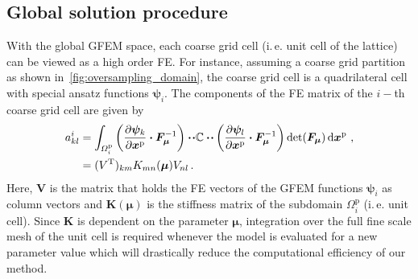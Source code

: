 \documentclass[a4paper]{eccomas_paper-2024}
\makeatletter
\newcommand{\ie}{i.\,e.\@\xspace}
\newcommand{\m}{\bm\mu}
\newcommand{\p}{\mathrm{p}}
\renewcommand{\top}{\mathrm{T}}
\makeatother
\begin{document}
\subsection{Global solution procedure} %
\label{sub:Online efficiency}
With the global GFEM space, each coarse grid cell (\ie{} unit cell of the lattice) can be viewed as a high order FE.
For instance, assuming a coarse grid partition as shown in~\cref{fig:oversampling_domain}, the coarse grid cell is a quadrilateral cell with special ansatz functions $\bm{\psi}_i$.
The components of the FE matrix of the $i-$th coarse grid cell are given by
\begin{align}
    \begin{split}
        a^i_{kl} &= \int_{\varOmega^{\p}_i} \left(\pdv{\bm{\psi}_k}{\bm{x}^{\p}}\vdot\bm{F}^{-1}_{\m}\right)\vdot\!\vdot \mathbb{C} \vdot\!\vdot
    \left(\pdv{\bm{\psi}_l}{\bm{x}^{\p}}\vdot\bm{F}^{-1}_{\m}\right)\det(\bm{F}_{\m})\dd{\bm{x}^{\p}}\,,\\
                 &= ({V}^\top)_{km} {K}_{mn}(\m){V}_{nl}\,.
    \end{split}
    \label{eq:element_matrix}
\end{align}
Here, $\bm{V}$ is the matrix that holds the FE vectors of the GFEM functions $\bm\psi_i$ as column vectors and $\bm{K}(\m)$ is the stiffness matrix of the subdomain $\varOmega^{\p}_i$ (\ie{} unit cell).
Since $\bm{K}$ is dependent on the parameter $\m$, integration over the full fine scale mesh of the unit cell is required whenever the model is evaluated for a new parameter value which will drastically reduce the computational efficiency of our method.
\end{document}
